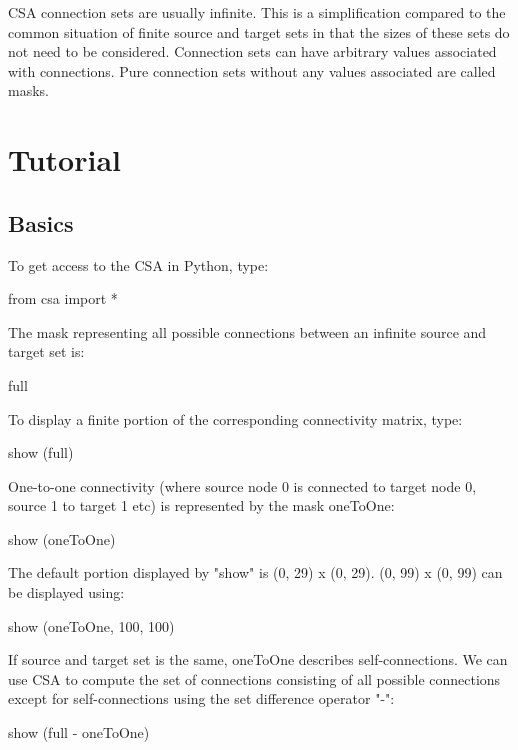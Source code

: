 \documentclass[a4paper,twoside]{report}
\begin{document}
CSA connection sets are usually infinite.  This is a simplification
compared to the common situation of finite source and target sets in
that the sizes of these sets do not need to be considered.  Connection
sets can have arbitrary values associated with connections.  Pure
connection sets without any values associated are called masks.

\chapter{Tutorial}\label{sec:tutorial}

\section{Basics}

To get access to the CSA in Python, type:

\begin{code}{}
  from csa import *
\end{code}

The mask representing all possible connections between an infinite
source and target set is:

\begin{code}{}
  full
\end{code}

To display a finite portion of the corresponding connectivity matrix,
type:

\begin{code}{}
  show (full)
\end{code}

One-to-one connectivity (where source node 0 is connected to target
node 0, source 1 to target 1 etc) is represented by the mask oneToOne:

\begin{code}{}
  show (oneToOne)
\end{code}

The default portion displayed by "show" is (0, 29) x (0, 29).
(0, 99) x (0, 99) can be displayed using:

\begin{code}{}
  show (oneToOne, 100, 100)
\end{code}

If source and target set is the same, oneToOne describes
self-connections.  We can use CSA to compute the set of connections
consisting of all possible connections except for self-connections
using the set difference operator "-":

\begin{code}{}
  show (full - oneToOne)
\end{code}
\end{document}
